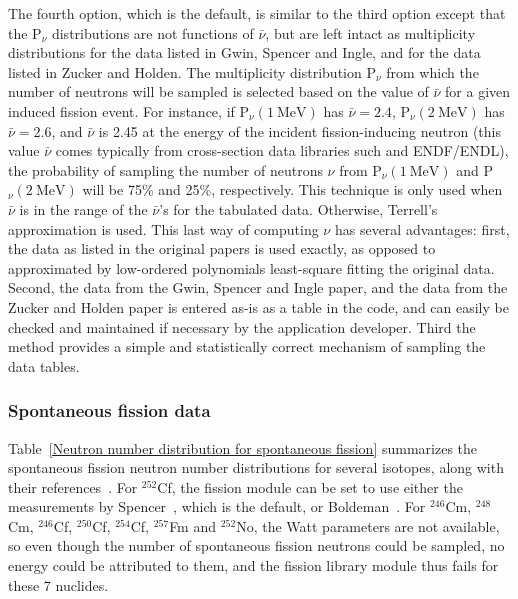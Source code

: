 The fourth option, which is the default,
is similar to the third option except that the P$_{\nu}$ distributions
are not functions of $\bar{\nu}$, but are left intact as multiplicity
distributions for the data listed in Gwin, Spencer and
Ingle, and for the data listed in Zucker and
Holden. The multiplicity distribution P$_{\nu}$ from which the number
of neutrons will be sampled is selected based on the value of
$\bar{\nu}$ for a given induced fission event.  For instance, if
P$_{\nu}(1\ \mathrm{MeV})$ has $\bar{\nu}=2.4$, P$_{\nu}(2\ \mathrm{MeV})$ has
$\bar{\nu}=2.6$, and $\bar{\nu}$ is 2.45 at the energy of the incident
fission-inducing neutron (this value $\bar{\nu}$ comes typically from
cross-section data libraries such and ENDF/ENDL), the probability of
sampling the number of neutrons ${\nu}$ from P$_{\nu}(1\ \mathrm{MeV})$ and
P$_{\nu}(2\ \mathrm{MeV})$ will be 75\% and 25\%, respectively. This technique
is only used when $\bar{\nu}$ is in the range of the $\bar{\nu}$'s for
the tabulated data. Otherwise, Terrell's approximation is used.  This
last way of computing ${\nu}$ has several advantages: first, the data
as listed in the original papers is used exactly, as opposed to
approximated by low-ordered polynomials least-square fitting the
original data. Second, the data from the Gwin, Spencer and
Ingle paper, and the data from the Zucker and Holden paper is
entered as-is as a table in the code, and can easily be checked and
maintained if necessary by the application developer. Third the method
provides a simple and statistically correct mechanism of sampling the
data tables. 

\subsubsection*{Spontaneous fission data}

Table~\ref{Neutron number distribution for spontaneous fission} summarizes
the spontaneous fission neutron number distributions for several isotopes,
along with their references~\cite{Holden and Zucker BNL,Santi 2005,
BNL-36467,Dakavoski 1973,Hoffman 1980,Lazarev 1974}. For $^{252}$Cf, the 
fission module can be set to use either the measurements by 
Spencer~\cite{Spencer 1982}, which is the 
default, or Boldeman~\cite{Boldeman 1985}.
For $^{246}$Cm, $^{248}$Cm, $^{246}$Cf, $^{250}$Cf, $^{254}$Cf, $^{257}$Fm 
and $^{252}$No, the Watt parameters are not available, so even though the 
number of spontaneous fission neutrons could be sampled, no energy could be 
attributed to them, and the fission library module thus fails for these
7 nuclides.

